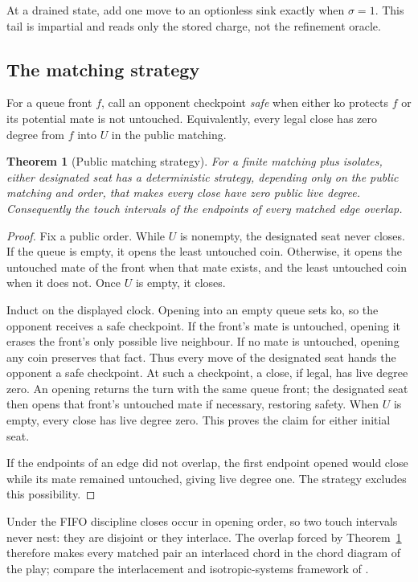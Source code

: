 \documentclass[11pt]{article}
\newtheorem{theorem}{Theorem}[section]
\theoremstyle{definition}
\theoremstyle{remark}
\begin{document}
At a drained state, add one move to an optionless sink exactly when
$\sigma=1$.  This tail is impartial and reads only the stored charge, not the
refinement oracle.

\subsection{The matching strategy}

For a queue front $f$, call an opponent checkpoint \emph{safe} when either
ko protects $f$ or its potential mate is not untouched.  Equivalently, every
legal close has zero degree from $f$ into $U$ in the public matching.

\begin{theorem}[Public matching strategy]\label{thm:matching}
For a finite matching plus isolates, either designated seat has a
deterministic strategy, depending only on the public matching and order, that
makes every close have zero public live degree.  Consequently the touch
intervals of the endpoints of every matched edge overlap.
\end{theorem}

\begin{proof}
Fix a public order.  While $U$ is nonempty, the designated seat never closes.
If the queue is empty, it opens the least untouched coin.  Otherwise, it opens
the untouched mate of the front when that mate exists, and the least untouched
coin when it does not.  Once $U$ is empty, it closes.

Induct on the displayed clock.  Opening into an empty queue sets ko, so the
opponent receives a safe checkpoint.  If the front's mate is untouched,
opening it erases the front's only possible live neighbour.  If no mate is
untouched, opening any coin preserves that fact.  Thus every move of the
designated seat hands the opponent a safe checkpoint.  At such a checkpoint,
a close, if legal, has live degree zero.  An opening returns the turn with the
same queue front; the designated seat then opens that front's untouched mate
if necessary, restoring safety.  When $U$ is empty, every close has live
degree zero.  This proves the claim for either initial seat.

If the endpoints of an edge did not overlap, the first endpoint opened would
close while its mate remained untouched, giving live degree one.  The strategy
excludes this possibility.
\end{proof}

Under the FIFO discipline closes occur in opening order, so two touch
intervals never nest: they are disjoint or they interlace.  The overlap
forced by Theorem~\ref{thm:matching} therefore makes every matched pair an
interlaced chord in the chord diagram of the play; compare the interlacement
and isotropic-systems framework of \cite{brijdertraldi2016}.
\end{document}
